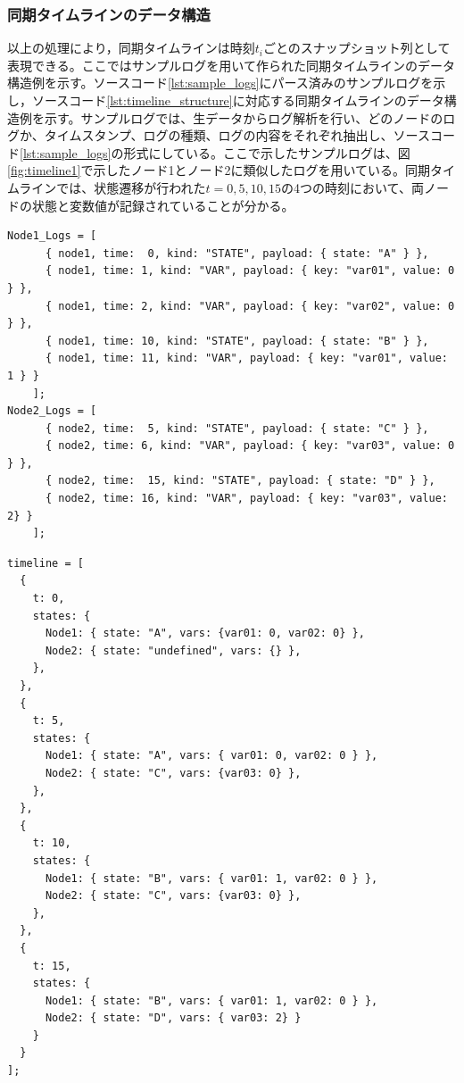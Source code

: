 \documentclass[12pt]{jreport}
\begin{document}
\subsubsection{同期タイムラインのデータ構造}
\begin{par}
以上の処理により，同期タイムラインは時刻$t_i$ごとのスナップショット列として表現できる。ここではサンプルログを用いて作られた同期タイムラインのデータ構造例を示す。ソースコード\ref{lst:sample_logs}にパース済みのサンプルログを示し，ソースコード\ref{lst:timeline_structure}に対応する同期タイムラインのデータ構造例を示す。サンプルログでは、生データからログ解析を行い、どのノードのログか、タイムスタンプ、ログの種類、ログの内容をそれぞれ抽出し、ソースコード\ref{lst:sample_logs}の形式にしている。ここで示したサンプルログは、図\ref{fig:timeline1}で示したノード1とノード2に類似したログを用いている。同期タイムラインでは、状態遷移が行われた$t=0,5,10,15$の4つの時刻において、両ノードの状態と変数値が記録されていることが分かる。
\end{par}
\begin{lstlisting}[caption=パース済みサンプルログ,label=lst:sample_logs]
   Node1_Logs = [
      { node1, time:  0, kind: "STATE", payload: { state: "A" } },
      { node1, time: 1, kind: "VAR", payload: { key: "var01", value: 0 } },
      { node1, time: 2, kind: "VAR", payload: { key: "var02", value: 0 } },
      { node1, time: 10, kind: "STATE", payload: { state: "B" } },
      { node1, time: 11, kind: "VAR", payload: { key: "var01", value: 1 } }
    ];
Node2_Logs = [
      { node2, time:  5, kind: "STATE", payload: { state: "C" } },
      { node2, time: 6, kind: "VAR", payload: { key: "var03", value: 0 } },
      { node2, time:  15, kind: "STATE", payload: { state: "D" } },
      { node2, time: 16, kind: "VAR", payload: { key: "var03", value: 2} }
    ];
\end{lstlisting}

\begin{lstlisting}[caption=同期タイムラインのデータ構造,label=lst:timeline_structure]
timeline = [
  {
    t: 0,
    states: {
      Node1: { state: "A", vars: {var01: 0, var02: 0} },
      Node2: { state: "undefined", vars: {} },
    },
  },
  {
    t: 5,
    states: {
      Node1: { state: "A", vars: { var01: 0, var02: 0 } },
      Node2: { state: "C", vars: {var03: 0} },
    },
  },
  {
    t: 10,
    states: {
      Node1: { state: "B", vars: { var01: 1, var02: 0 } },
      Node2: { state: "C", vars: {var03: 0} },
    },
  },
  {
    t: 15,
    states: {
      Node1: { state: "B", vars: { var01: 1, var02: 0 } },
      Node2: { state: "D", vars: { var03: 2} }
    }
  }
];
\end{lstlisting}
\end{document}
